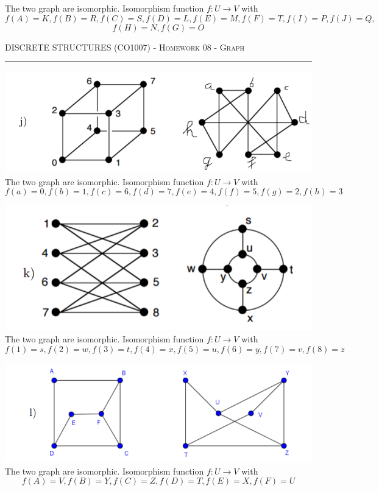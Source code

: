 \documentclass{article}
\begin{document}
The two graph are isomorphic. Isomorphism function $ f : U \rightarrow V $ with
$$ f(A) = K, f(B) = R, f(C) = S, f(D) = L, f(E) = M, f(F) = T, f(I) = P, f(J) = Q, $$
$$ f(H) = N, f(G) = O $$
\newpage

{\scshape } \hfill {\scshape DISCRETE STRUCTURES (CO1007) - Homework 08 - Graph} \hfill {\scshape }
 
\smallskip

\hrule

\bigskip

\bigskip 
\includegraphics[scale = 0.7]{problem_4/graph_4.j.png}
\newline
The two graph are isomorphic. Isomorphism function $ f : U \rightarrow V $ with
$$ f(a) = 0, f(b) = 1, f(c) = 6, f(d) = 7, f(e) = 4, f(f) = 5, f(g) = 2, f(h) = 3 $$

\includegraphics[scale = 0.8]{problem_4/graph_4.k.png}
\newline
The two graph are isomorphic. Isomorphism function $ f : U \rightarrow V $ with
$$ f(1) = s, f(2) = w, f(3) = t, f(4) = x, f(5) = u, f(6) = y, f(7) = v, f(8) = z $$

\includegraphics[scale = 0.7]{problem_4/graph_4.l.png}
\newline
The two graph are isomorphic. Isomorphism function $ f : U \rightarrow V $ with
$$ f(A) = V, f(B) = Y, f(C) = Z, f(D) = T, f(E) = X, f(F) = U $$
\end{document}
